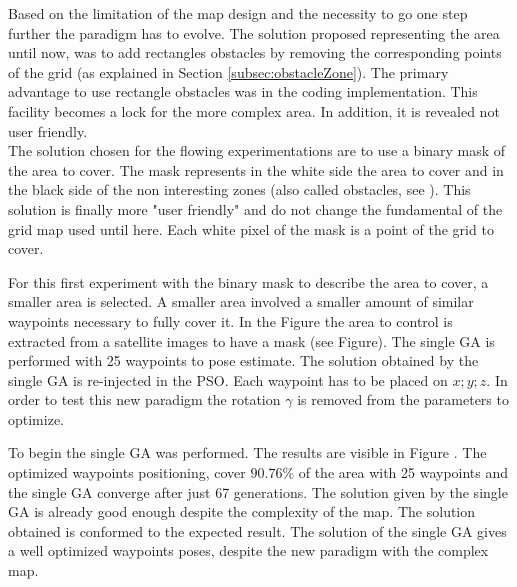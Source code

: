 Based on the limitation of the map design and the necessity to go one step further the paradigm has to evolve.
The solution proposed representing the area until now, was to add rectangles obstacles by removing the corresponding points of the grid (as explained in Section \ref{subsec:obstacleZone}). The primary advantage to use rectangle obstacles was in the coding implementation. 
This facility becomes a lock for the more complex area. In addition, it is revealed not user friendly.\\
 The solution chosen for the flowing experimentations are to use a binary mask of the area to cover. The mask represents in the white side the area to cover and in the black side of the non interesting zones (also called obstacles, see ). This solution is finally more "user friendly"  and do not change the fundamental of the grid map used until here. Each white pixel of the mask is a point of the grid to cover.  
 

For this first experiment with the binary mask to describe the area to cover, a smaller area is selected. A smaller area involved a smaller amount of similar waypoints necessary to fully cover it. In the Figure  the area to control is extracted from a satellite images to have a mask (see Figure). The single GA is performed  with 25 waypoints to pose estimate. The solution obtained by the single GA is re-injected in the PSO. Each waypoint has to be placed on $x; y; z$. In order to test this new paradigm the rotation $\gamma$ is removed from the parameters to optimize.

 To begin the single GA was performed. The results are visible in Figure . The optimized waypoints positioning, cover $90.76\%$ of the area with 25 waypoints and the single GA converge after just 67 generations. The solution given by the single GA is already good enough despite the complexity of the map. 
  The solution obtained is conformed to the expected result. The solution of the single GA gives a well optimized waypoints poses, despite the new paradigm with the complex map. 
  
